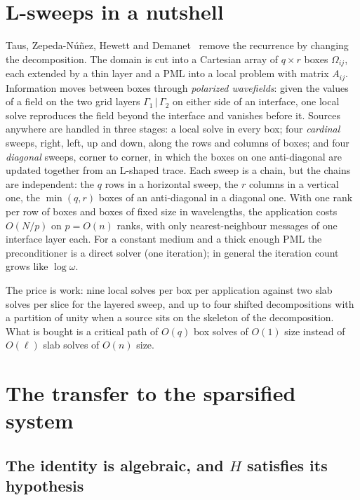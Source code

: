 \documentclass[11pt]{article}
\newcommand{\Om}{\Omega}
\newcommand{\Gam}{\Gamma}
\begin{document}
\section{L-sweeps in a nutshell}

Taus, Zepeda-N\'u\~nez, Hewett and Demanet~\cite{Taus2020} remove the recurrence by
changing the decomposition. The domain is cut into a Cartesian array of $q\times r$ boxes
$\Om_{ij}$, each extended by a thin layer and a PML into a local problem with matrix
$A_{ij}$. Information moves between boxes through \emph{polarized wavefields}: given the
values of a field on the two grid layers $\Gam_1\,|\,\Gam_2$ on either side of an
interface, one local solve reproduces the field beyond the interface and vanishes before
it. Sources anywhere are handled in three stages: a local solve in every box; four
\emph{cardinal} sweeps, right, left, up and down, along the rows and columns of boxes;
and four \emph{diagonal} sweeps, corner to corner, in which the boxes on one
anti-diagonal are updated together from an L-shaped trace. Each sweep is a chain, but the
chains are independent: the $q$ rows in a horizontal sweep, the $r$ columns in a vertical
one, the $\min(q,r)$ boxes of an anti-diagonal in a diagonal one. With one rank per row
of boxes and boxes of fixed size in wavelengths, the application costs $O(N/p)$ on
$p=O(n)$ ranks, with only nearest-neighbour messages of one interface layer each. For a
constant medium and a thick enough PML the preconditioner is a direct solver (one
iteration); in general the iteration count grows like $\log\omega$.

The price is work: nine local solves per box per application against two slab solves
per slice for the layered sweep, and up to four shifted decompositions with a partition
of unity when a source sits on the skeleton of the decomposition. What is bought is a
critical path of $O(q)$ box solves of $O(1)$ size instead of $O(\ell)$ slab solves of
$O(n)$ size.

\section{The transfer to the sparsified system}

\subsection{The identity is algebraic, and $H$ satisfies its hypothesis}
\end{document}
